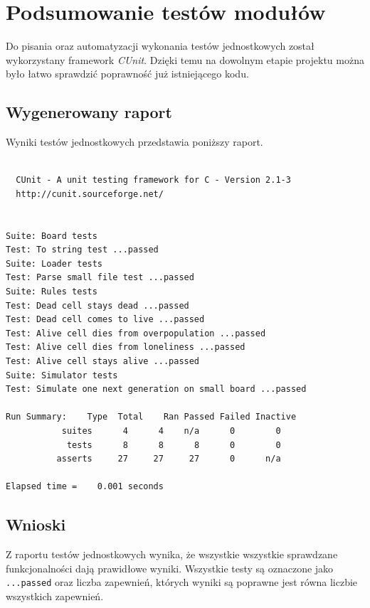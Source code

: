 \documentclass{mwart}
\begin{document}
\section{Podsumowanie testów modułów}
Do pisania oraz automatyzacji wykonania testów jednostkowych został wykorzystany framework \textit{CUnit}. Dzięki temu na dowolnym etapie projektu można było łatwo sprawdzić poprawność już istniejącego kodu.

\subsection{Wygenerowany raport}
Wyniki testów jednostkowych przedstawia poniższy raport.

\begin{verbatim}

  CUnit - A unit testing framework for C - Version 2.1-3
  http://cunit.sourceforge.net/


Suite: Board tests
Test: To string test ...passed
Suite: Loader tests
Test: Parse small file test ...passed
Suite: Rules tests
Test: Dead cell stays dead ...passed
Test: Dead cell comes to live ...passed
Test: Alive cell dies from overpopulation ...passed
Test: Alive cell dies from loneliness ...passed
Test: Alive cell stays alive ...passed
Suite: Simulator tests
Test: Simulate one next generation on small board ...passed

Run Summary:    Type  Total    Ran Passed Failed Inactive
           suites      4      4    n/a      0        0
            tests      8      8      8      0        0
          asserts     27     27     27      0      n/a

Elapsed time =    0.001 seconds
\end{verbatim}

\subsection{Wnioski}
Z raportu testów jednostkowych wynika, że wszystkie wszystkie sprawdzane funkcjonalności dają prawidłowe wyniki. Wszystkie testy są oznaczone jako \texttt{...passed} oraz liczba zapewnień, których wyniki są poprawne jest równa liczbie wszystkich zapewnień.
\end{document}
